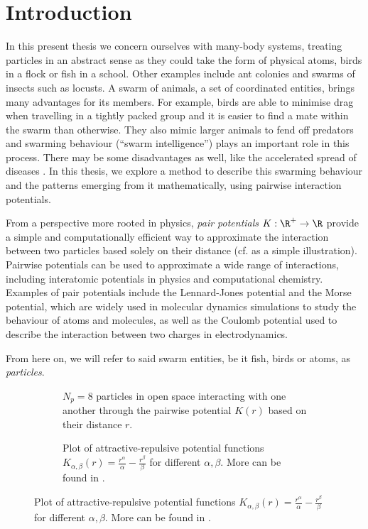\chapter{Introduction}
\label{chap:introduction}

In this present thesis we concern ourselves with many-body systems, treating particles in an abstract sense as they could take the form of physical atoms, birds in a flock or fish in a school.
Other examples include ant colonies and swarms of insects such as locusts.
A swarm of animals, a set of coordinated entities, brings many advantages for its members.
For example, birds are able to minimise drag when travelling in a tightly packed group and it is easier to find a mate within the swarm than otherwise.
They also mimic larger animals to fend off predators and swarming behaviour (``swarm intelligence'') plays an important role in this process.
There may be some disadvantages as well, like the accelerated spread of diseases \parencite{2017-maria-orsogna-swarm-video}.
In this thesis, we explore a method to describe this swarming behaviour and the patterns emerging from it mathematically, using pairwise interaction potentials.

From a perspective more rooted in physics, \textit{pair potentials} $K: \R^+ \to \R$ provide a simple and computationally efficient way to approximate the interaction between two particles based solely on their distance (cf.  as a simple illustration).
Pairwise potentials can be used to approximate a wide range of interactions, including interatomic potentials in physics and computational chemistry.
Examples of pair potentials include the Lennard-Jones potential and the Morse potential, which are widely used in molecular dynamics simulations to study the behaviour of atoms and molecules, as well as the Coulomb potential used to describe the interaction between two charges in electrodynamics.

From here on, we will refer to said swarm entities, be it fish, birds or atoms, as \textit{particles}.

\begin{figure}[H]
  \centering
  \begin{subfigure}[t]{0.47\textwidth}
    \centering
    \caption[]{$N_p = 8$ particles in open space interacting with one another through the pairwise potential $K(r)$ based on their distance $r$.}
    \label{fig:problem-setting}
  \end{subfigure}
  \hfill
  \begin{subfigure}[t]{0.47\textwidth}
    \centering
    \caption[]{Plot of attractive-repulsive potential functions $K_{\alpha, \beta}(r) = \frac{r^\alpha}{\alpha} - \frac{r^\beta}{\beta}$ for different $\alpha, \beta$. More can be found in .}
    \label{fig:potential-function}
  \end{subfigure}
\end{figure}

